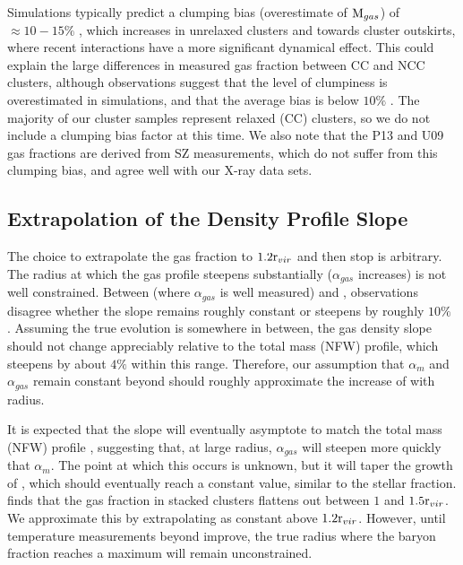 Simulations typically predict a clumping bias (overestimate of
$\textrm{M}{}_{gas}$) of $\approx10-15\%$ \citep{Nagai2011,Battaglia2013},
which increases in unrelaxed clusters and towards cluster outskirts,
where recent interactions have a more significant dynamical
effect. This could explain the large differences in measured gas
fraction between CC and NCC clusters, although observations suggest
that the level of clumpiness is overestimated in simulations, and that
the average bias is below $10\%$ \citep{Eckert2013c}. The majority of our
cluster samples represent relaxed (CC) clusters, so we do not include
a clumping bias factor at this time. We also note that the P13
\citep{PlanckIntV} and U09 \citep{Umetsu2009} gas fractions are
derived from SZ measurements, which do not suffer from this clumping
bias, and agree well with our X-ray data sets. 

\subsection{Extrapolation of the Density Profile Slope}
\label{sec:Limitations.Slope}
The choice to extrapolate the gas fraction to $1.2\textrm{r\ensuremath{_{vir}}}{}$ and then
stop is arbitrary. The radius at which the gas profile steepens
substantially ($\alpha{}_{gas}$ increases) is not well constrained.
 Between \rfive{} (where $\alpha{}_{gas}$ is well
measured) and \rtwo{}, observations disagree whether the slope remains
roughly constant \citep{Dai2010} or steepens by roughly $10\%$
\citep{Ettori2009a}. Assuming the true evolution is somewhere in
between, the gas density slope should not change appreciably relative
to the total mass (NFW) profile, which steepens by about $4\%$ within
this range. Therefore, our assumption that $\alpha{}_{m}$ and
$\alpha_{gas}$ remain constant beyond \rtwo{} should roughly
approximate the increase of \fg{} with radius. 

It is expected that the slope will eventually asymptote to match the
total mass (NFW) profile \citep{Umetsu2009, Battaglia2013}, suggesting
that, at large radius, $\alpha_{gas}$ will steepen more quickly that
$\alpha_{m}$. The point at which this occurs is unknown, but it will
taper the growth of \fg{}, which should eventually reach a constant
value, similar to the stellar fraction.  \citet{PlanckIntV} finds that
the gas fraction in stacked \Planck{} clusters flattens out between
$1$ and $1.5\textrm{r\ensuremath{_{vir}}}{}$. We approximate this by extrapolating \fb{} as
constant above $1.2\textrm{r\ensuremath{_{vir}}}{}$. However, until temperature measurements
beyond \rfive{} improve, the true radius where the baryon fraction
reaches a maximum will remain unconstrained. 

